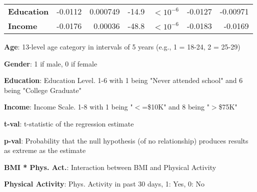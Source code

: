 \documentclass[11pt]{article}
\begin{document}
\begin{table}[h]
\begin{threeparttable}
{\begin{tabular}{lrrrlrr}
\textbf{Education} & \raisebox{2ex}{\hypertarget{B7a}{}}-0.0112 & \raisebox{2ex}{\hypertarget{B7b}{}}0.000749 & \raisebox{2ex}{\hypertarget{B7c}{}}-14.9 & $<$\raisebox{2ex}{\hypertarget{B7d}{}}$10^{-6}$ & \raisebox{2ex}{\hypertarget{B7e}{}}-0.0127 & \raisebox{2ex}{\hypertarget{B7f}{}}-0.00971 \\
\textbf{Income} & \raisebox{2ex}{\hypertarget{B8a}{}}-0.0176 & \raisebox{2ex}{\hypertarget{B8b}{}}0.00036 & \raisebox{2ex}{\hypertarget{B8c}{}}-48.8 & $<$\raisebox{2ex}{\hypertarget{B8d}{}}$10^{-6}$ & \raisebox{2ex}{\hypertarget{B8e}{}}-0.0183 & \raisebox{2ex}{\hypertarget{B8f}{}}-0.0169 \\
\bottomrule
\end{tabular}}
\begin{tablenotes}
\footnotesize
\item \textbf{Age}: 13-level age category in intervals of 5 years (e.g., 1 = 18-24, 2 = 25-29)
\item \textbf{Gender}: 1 if male, 0 if female
\item \textbf{Education}: Education Level. 1-6 with 1 being "Never attended school" and 6 being "College Graduate"
\item \textbf{Income}: Income Scale. 1-8 with 1 being "$<$=\$10K" and 8 being "$>$\$75K"
\item \textbf{t-val}: t-statistic of the regression estimate
\item \textbf{p-val}: Probability that the null hypothesis (of no relationship) produces results as extreme as the estimate
\item \textbf{BMI * Phys. Act.}: Interaction between BMI and Physical Activity
\item \textbf{Physical Activity}: Phys. Activity in past 30 days, 1: Yes, 0: No
\end{tablenotes}
\end{threeparttable}
\end{table}
\end{document}
